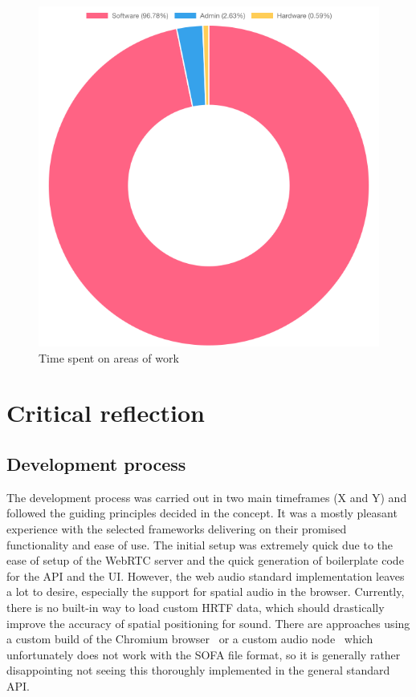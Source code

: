 \begin{figure}[h]
\centering
\includegraphics[scale=0.5]{04_Artefakte/01_Abbildungen/time-spent-on-types-of-work}
\caption[Time spent on areas of work]{Time spent on areas of work\protect}
\label{fig:timeSpentTypeOfWork}
\end{figure}

\section{Critical reflection}
\label{sec:critical-reflection}

\subsection{Development process}

The development process was carried out in two main timeframes (X and Y) and followed the guiding principles decided in the concept.
It was a mostly pleasant experience with the selected frameworks delivering on their promised functionality and ease of use.
The initial setup was extremely quick due to the ease of setup of the WebRTC server and the quick generation of boilerplate code for the \ac{API} and the \ac{UI}.
However, the web audio standard implementation leaves a lot to desire, especially the support for spatial audio in the browser.
Currently, there is no built-in way to load custom \ac{HRTF} data, which should drastically improve the accuracy of spatial positioning for sound.
There are approaches using a custom build of the Chromium browser~\parencite{chromiumCustomHrtf} or a custom audio node~\parencite{customHrtfAudioNode} which unfortunately does not work with the \ac{SOFA} file format, so it is generally rather disappointing not seeing this thoroughly implemented in the general standard \ac{API}.

